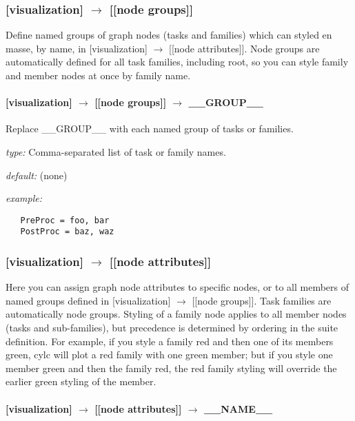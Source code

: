 \subsubsection[{[[}node groups{]]}]{[visualization] $\rightarrow$ [[node groups]]}

Define named groups of graph nodes (tasks and families) which can styled
en masse, by name, in [visualization] $\rightarrow$ [[node attributes]].
Node groups are automatically defined for all task families, including
root, so you can style family and member nodes at once by family name.

\paragraph[\_\_GROUP\_\_]{[visualization] $\rightarrow$ [[node groups]] $\rightarrow$ \_\_GROUP\_\_}

Replace \_\_GROUP\_\_ with each named group of tasks or families.

\begin{myitemize}
    \item {\em type:} Comma-separated list of task or family names.
    \item {\em default:} (none)
    \item {\em example:}
\begin{lstlisting}
   PreProc = foo, bar
   PostProc = baz, waz
\end{lstlisting}
\end{myitemize}

\subsubsection[{[[}node attributes{]]}]{[visualization] $\rightarrow$ [[node attributes]]}

Here you can assign graph node attributes to specific nodes, or to all
members of named groups defined in [visualization] $\rightarrow$ [[node
groups]]. Task families are automatically node groups. Styling of a
family node applies to all member nodes (tasks and sub-families), but
precedence is determined by ordering in the suite definition.  For
example, if you style a family red and then one of its members green,
cylc will plot a red family with one green member; but if you style one
member green and then the family red, the red family styling will
override the earlier green styling of the member.

\paragraph[\_\_NAME\_\_]{[visualization] $\rightarrow$ [[node attributes]] $\rightarrow$ \_\_NAME\_\_}

